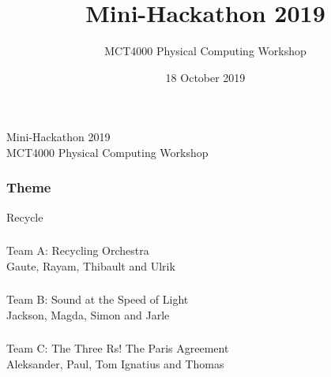 \documentclass[screen, aspectratio=169]{beamer}
\title[mini-hackathon]{Mini-Hackathon 2019}
\subtitle{MCT4000 Physical Computing Workshop}
\institute[NTNU]{Department of Music, NTNU}
\date{18 October 2019}
\begin{document}
\begin{frame}
  \titlepage
\end{frame}
%
\begin{frame}
\frametitle{}
{\Huge Mini-Hackathon 2019}\\
\vspace{1cm}
{\huge MCT4000 Physical Computing Workshop}
\end{frame}
%
\begin{frame}
\frametitle{Theme}
{\Huge Recycle}
\end{frame}
%
\usebackgroundtemplate{}
\begin{frame}
\frametitle{}
{\Huge Team A: Recycling Orchestra}\\
\vspace{1cm}
{\huge Gaute, Rayam, Thibault and Ulrik}
\end{frame}
%
\usebackgroundtemplate{}
\begin{frame}
\frametitle{}
{\Huge Team B: Sound at the Speed of Light}\\
\vspace{1cm}
{\huge Jackson, Magda, Simon and Jarle}
\end{frame}
%
\usebackgroundtemplate{}
\begin{frame}
\frametitle{}
{\Huge Team C: The Three Rs! The Paris Agreement}\\
\vspace{1cm}
{\huge Aleksander, Paul, Tom Ignatius and Thomas}
\end{frame}
%
\end{document}
